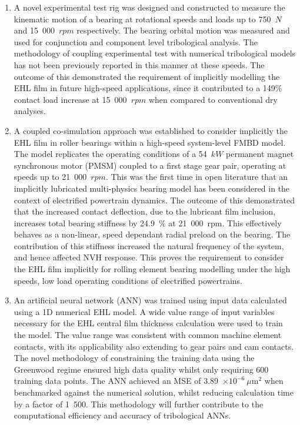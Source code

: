 \begin{enumerate}
	\item A novel experimental test rig was designed and constructed to measure the kinematic motion of a bearing at rotational speeds and loads up to 750~$N$ and 15~000~$rpm$ respectively. The bearing orbital motion was measured and used for conjunction and component level tribological analysis. The methodology of coupling experimental test with numerical tribological models has not been previously reported in this manner at these speeds. The outcome of this demonstrated the requirement of implicitly modelling the EHL film in future high-speed applications, since it contributed to a 149\% contact load increase at 15~000~$rpm$ when compared to conventional dry analyses.
	
	\item A coupled co-simulation approach was established to consider implicitly the EHL film in roller bearings within a high-speed system-level FMBD model. The model replicates the operating conditions of a 54~$kW$ permanent magnet synchronous motor (PMSM) coupled to a first stage gear pair, operating at speeds up to 21~000~$rpm$. This was the first time in open literature that an implicitly lubricated multi-physics bearing model has been considered in the context of electrified powertrain dynamics. The outcome of this demonstrated that the increased contact deflection, due to the lubricant film inclusion, increases total bearing stiffness by 24.9~\% at 21~000~rpm. This effectively behaves as a non-linear, speed dependant radial preload on the bearing. The contribution of this stiffness increased the natural frequency of the system, and hence affected NVH response. This proves the requirement to consider the EHL film implicitly for rolling element bearing modelling under the high speeds, low load operating conditions of electrified powertrains.
	
	\item An artificial neural network (ANN) was trained using input data calculated using a 1D numerical EHL model. A wide value range of input variables necessary for the EHL central film thickness calculation were used to train the model. The value range was consistent with common machine element contacts, with its applicability also extending to gear pairs and cam contacts. The novel methodology of constraining the training data using the Greenwood regime ensured high data quality whilst only requiring 600 training data points. The ANN achieved an MSE of 3.89~$\times 10^{-6}~\mu \mathrm{m}^2$ when benchmarked against the numerical solution, whilst reducing calculation time by a factor of 1~500. This methodology will further contribute to the computational efficiency and accuracy of tribological ANNs.
	

\end{enumerate}
